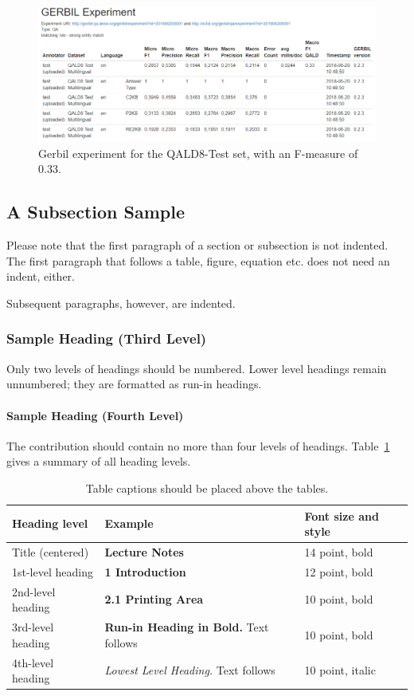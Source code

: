 \documentclass[runningheads]{llncs}
\begin{document}
\begin{figure}
	\includegraphics[width=\textwidth]{QALD-8-Test.PNG}
	
	\caption{Gerbil experiment for the QALD8-Test set, with an F-measure of 0.33.}
	 \label{fig2} 
\end{figure}

\subsection{A Subsection Sample}
Please note that the first paragraph of a section or subsection is
not indented. The first paragraph that follows a table, figure,
equation etc. does not need an indent, either.

Subsequent paragraphs, however, are indented.

\subsubsection{Sample Heading (Third Level)} Only two levels of
headings should be numbered. Lower level headings remain unnumbered;
they are formatted as run-in headings.

\paragraph{Sample Heading (Fourth Level)}
The contribution should contain no more than four levels of
headings. Table~\ref{tab1} gives a summary of all heading levels.

\begin{table}
\caption{Table captions should be placed above the
tables.}\label{tab1}
\begin{tabular}{|l|l|l|}
\hline
Heading level &  Example & Font size and style\\
\hline
Title (centered) &  {\Large\bfseries Lecture Notes} & 14 point, bold\\
1st-level heading &  {\large\bfseries 1 Introduction} & 12 point, bold\\
2nd-level heading & {\bfseries 2.1 Printing Area} & 10 point, bold\\
3rd-level heading & {\bfseries Run-in Heading in Bold.} Text follows & 10 point, bold\\
4th-level heading & {\itshape Lowest Level Heading.} Text follows & 10 point, italic\\
\hline
\end{tabular}
\end{table}
\end{document}
